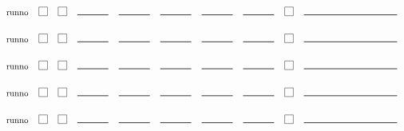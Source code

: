 \documentclass[12pt]{article}
\newcommand{\cbox}{\raisebox{.6ex}{\fbox{\rule{0in}{0.05in}\rule{0.05in}{0in}}}}
\newcommand{\eline}{\rule{0.5in}{0.01in}}
\newcommand{\cmline}{\rule{1.5in}{0.01in}}
\begin{document}
$$\begin{tabular}{lccccccccc}
runno & \cbox & \cbox & \eline & \eline & \eline & \eline & \eline & \cbox & \cmline \\[0.250in]
runno & \cbox & \cbox & \eline & \eline & \eline & \eline & \eline & \cbox & \cmline \\[0.250in]
runno & \cbox & \cbox & \eline & \eline & \eline & \eline & \eline & \cbox & \cmline \\[0.250in]
runno & \cbox & \cbox & \eline & \eline & \eline & \eline & \eline & \cbox & \cmline \\[0.250in]
runno & \cbox & \cbox & \eline & \eline & \eline & \eline & \eline & \cbox & \cmline \\[0.250in]
\end{tabular}
$$
\end{document}
